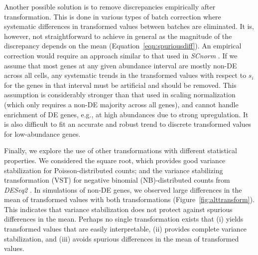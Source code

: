 \documentclass[10pt,letterpaper]{article}
\begin{document}
Another possible solution is to remove discrepancies empirically after transformation.
This is done in various types of batch correction \cite{ritchie2015limma,haghverdi2018batch} where systematic differences in transformed values between batches are eliminated.
It is, however, not straightforward to achieve in general as the magnitude of the discrepancy depends on the mean (Equation~\ref{eqn:spuriousdiff}).
An empirical correction would require an approach similar to that used in \textit{SCnorm} \cite{bacher2017scnorm}.
If we assume that most genes at any given abundance interval are mostly non-DE across all cells, any systematic trends in the transformed values with respect to $s_i$ for the genes in that interval must be artificial and should be removed.
This assumption is considerably stronger than that used in scaling normalization (which only requires a non-DE majority across all genes),
and cannot handle enrichment of DE genes, e.g., at high abundances due to strong upregulation.
It is also difficult to fit an accurate and robust trend to discrete transformed values for low-abundance genes.

Finally, we explore the use of other transformations with different statistical properties.
We considered the square root, which provides good variance stabilization for Poisson-distributed counts;
and the variance stabilizing transformation (VST) for negative binomial (NB)-distributed counts from \emph{DESeq2} \cite{love2014moderated}.
In simulations of non-DE genes, we observed large differences in the mean of transformed values with both transformations (Figure~\ref{fig:alttransform}).
This indicates that variance stabilization does not protect against spurious differences in the mean.
Perhaps no single transformation exists that 
(i) yields transformed values that are easily interpretable,
(ii) provides complete variance stabilization, and
(iii) avoids spurious differences in the mean of transformed values.
\end{document}
